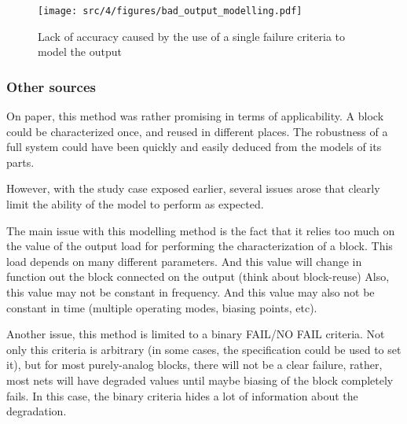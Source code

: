\begin{figure}[!htbp]
  \centering
  \texttt{[image: src/4/figures/bad\_output\_modelling.pdf]}
  \caption{Lack of accuracy caused by the use of a single failure criteria to model the output}
  \label{fig:impact-single-failure-criteria}
\end{figure}


\subsubsection{Other sources}


On paper, this method was rather promising in terms of applicability.
A block could be characterized once, and reused in different places.
The robustness of a full system could have been quickly and easily deduced from the models of its parts.

However, with the study case exposed earlier, several issues arose that clearly limit the ability of the model to perform as expected.

The main issue with this modelling method is the fact that it relies too much
on the value of the output load for performing the characterization of a block.
This load depends on many different parameters.
And this value will change in function out the block connected on the output (think about block-reuse)
Also, this value may not be constant in frequency.
And this value may also not be constant in time (multiple operating modes, biasing points, etc).



Another issue, this method is limited to a binary FAIL/NO FAIL criteria.
Not only this criteria is arbitrary (in some cases, the specification could be used to set it), but
for most purely-analog blocks, there will not be a clear failure, rather, most
nets will have degraded values until maybe biasing of the block completely fails.
In this case, the binary criteria hides a lot of information about the degradation.

